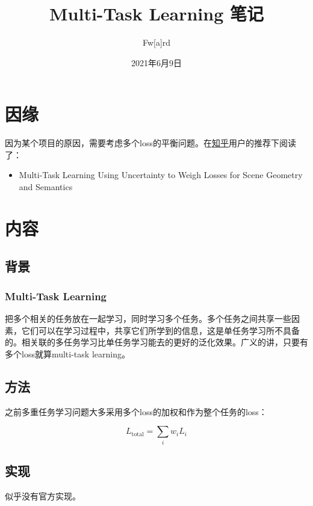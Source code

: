 \documentclass[a4paper,punct,fancyhdr]{ctexart}
\title{Multi-Task Learning 笔记}
\author{Fw[a]rd}
\date{2021年6月9日}
\begin{document}
\maketitle

\section{因缘}
因为某个项目的原因，需要考虑多个loss的平衡问题。在\href{https://www.zhihu.com/question/375794498}{知乎}用户的推荐下阅读了：

\begin{itemize}
    \item Multi-Task Learning Using Uncertainty to Weigh Losses for Scene Geometry and Semantics
\end{itemize}

\section{内容}
\subsection{背景}
\subsubsection{Multi-Task Learning}
把多个相关的任务放在一起学习，同时学习多个任务。多个任务之间共享一些因素，它们可以在学习过程中，共享它们所学到的信息，这是单任务学习所不具备的。相关联的多任务学习比单任务学习能去的更好的泛化效果。广义的讲，只要有多个loss就算multi-task learning。

\subsection{方法}

之前多重任务学习问题大多采用多个loss的加权和作为整个任务的loss：

\begin{equation}
    L_\mathrm{total} = \sum_i w_iL_i
\end{equation}

\subsection{实现}

似乎没有官方实现。


\end{document}
